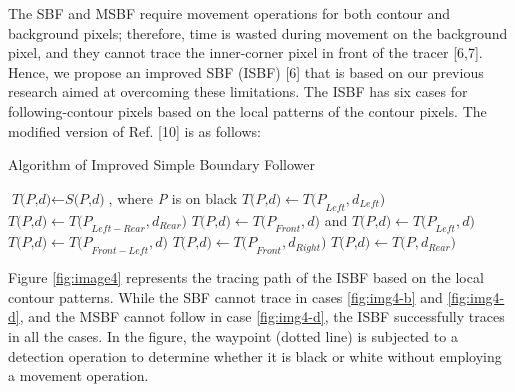 The SBF and MSBF require movement operations for both contour and background pixels; therefore, time is wasted during movement on the background pixel, and they cannot trace the inner-corner pixel in front of the tracer [6,7]. Hence, we propose an improved SBF (ISBF) [6] that is based on our previous research aimed at overcoming these limitations. The ISBF has six cases for following-contour pixels based on the local patterns of the contour pixels. The modified version of Ref. [10] is as follows: 

\begin{algorithm}
	\caption{Algorithm of Improved Simple Boundary Follower}\label{alg:isbf}
	\begin{algorithmic}[1]
	\State $\textit{T(P,d)} \gets \textit{S(P,d)}$, where \textit{P} is on black
	\Do
		\State $\textit{T(P,d)} \gets \textit{T(P}_{Left},\textit{d}_{Left} )  $
	\Else
			\State $\textit{T(P,d)} \gets \textit{T(P}_{Left-Rear},\textit{d}_{Rear} )  $
		\Else
					\State $\textit{T(P,d)} \gets \textit{T(P}_{Front},\textit{d} )  $ and $\textit{T(P,d)} \gets \textit{T(P}_{Left}, \textit{d})$
				\Else
					\State $\textit{T(P,d)} \gets \textit{T(P}_{Front-Left},\textit{d} )  $
				\EndIf
				\State $\textit{T(P,d)} \gets \textit{T(P}_{Front},\textit{d}_{Right} )  $
			\Else
				\State $\textit{T(P,d)} \gets \textit{T(P},\textit{d}_{Rear} )  $
			\EndIf
		\EndIf
	\EndIf
	\EndProcedure
	\end{algorithmic}
\end{algorithm}


Figure \ref{fig:image4} represents the tracing path of the ISBF based on the local contour patterns. While the SBF cannot trace in cases \ref{fig:img4-b} and \ref{fig:img4-d}, and the MSBF cannot follow in case \ref{fig:img4-d}, the ISBF successfully traces in all the cases. In the figure, the waypoint (dotted line) is subjected to a detection operation to determine whether it is black or white without employing a movement operation.

